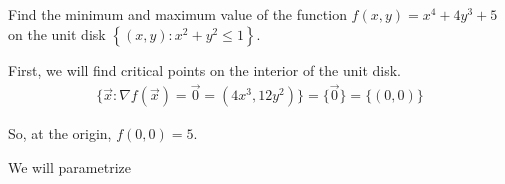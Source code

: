 \documentclass{article}
\begin{document}
  \begin{problem}
    Find the minimum and maximum value of the function $f(x,y)=x^4+4y^3+5$ on the unit disk $\left\{ (x,y):x^2+y^2\le 1 \right\} $.
  \end{problem}

  First, we will find critical points on the interior of the unit disk.
  \begin{align*}
    \{\vec{x}:\nabla f(\vec{x})=\vec{0}=(4x^3,12y^2)\}=\{\vec{0}\}=\{(0,0)\}
  \end{align*}

  So, at the origin, $f(0,0)=5$.

  We will parametrize 
\end{document}
